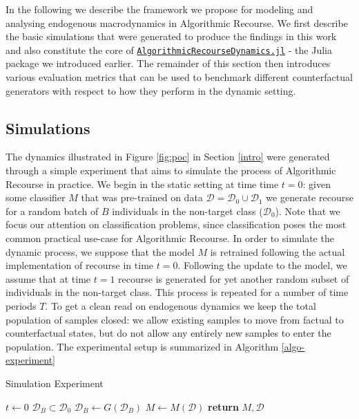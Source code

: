 \documentclass[conference,final,]{IEEEtran}
\begin{document}
In the following we describe the framework we propose for modeling and analysing endogenous macrodynamics in Algorithmic Recourse. We first describe the basic simulations that were generated to produce the findings in this work and also constitute the core of \href{https://anonymous.4open.science/r/AlgorithmicRecourseDynamics/README.md}{\texttt{AlgorithmicRecourseDynamics.jl}} - the Julia package we introduced earlier. The remainder of this section then introduces various evaluation metrics that can be used to benchmark different counterfactual generators with respect to how they perform in the dynamic setting.

\hypertarget{method-2-experiment}{%
\subsection{Simulations}\label{method-2-experiment}}

The dynamics illustrated in Figure \ref{fig:poc} in Section \ref{intro} were generated through a simple experiment that aims to simulate the process of Algorithmic Recourse in practice. We begin in the static setting at time time \(t=0\): given some classifier \(M\) that was pre-trained on data \(\mathcal{D}=\mathcal{D}_0 \cup \mathcal{D}_1\) we generate recourse for a random batch of \(B\) individuals in the non-target class (\(\mathcal{D}_0\)). Note that we focus our attention on classification problems, since classification poses the most common practical use-case for Algorithmic Recourse. In order to simulate the dynamic process, we suppose that the model \(M\) is retrained following the actual implementation of recourse in time \(t=0\). Following the update to the model, we assume that at time \(t=1\) recourse is generated for yet another random subset of individuals in the non-target class. This process is repeated for a number of time periods \(T\). To get a clean read on endogenous dynamics we keep the total population of samples closed: we allow existing samples to move from factual to counterfactual states, but do not allow any entirely new samples to enter the population. The experimental setup is summarized in Algorithm \ref{algo-experiment}

\begin{algorithm}
\caption{Simulation Experiment}\label{algo-experiment}
\begin{algorithmic}[1]
\State $t\gets 0$
\State $\mathcal{D}_B \subset \mathcal{D}_0$ 
\State $\mathcal{D}_B\gets G(\mathcal{D}_B)$ 
\State $M\gets M(\mathcal{D})$ 
\EndWhile
\State \textbf{return} $M,\mathcal{D}$
\EndProcedure
\end{algorithmic}
\end{algorithm}
\end{document}

